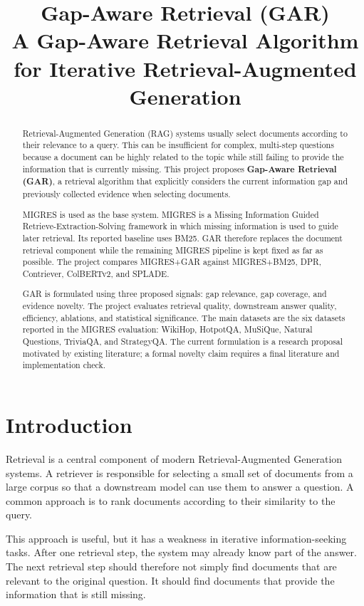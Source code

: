 \documentclass[11pt,a4paper]{article}
\title{\textbf{Gap-Aware Retrieval (GAR)}\\[4pt]\large A Gap-Aware Retrieval Algorithm for Iterative Retrieval-Augmented Generation}
\author{}
\date{}
\begin{document}
\maketitle

\begin{abstract}
Retrieval-Augmented Generation (RAG) systems usually select documents according to their relevance to a query. This can be insufficient for complex, multi-step questions because a document can be highly related to the topic while still failing to provide the information that is currently missing. This project proposes \textbf{Gap-Aware Retrieval (GAR)}, a retrieval algorithm that explicitly considers the current information gap and previously collected evidence when selecting documents.

MIGRES is used as the base system. MIGRES is a Missing Information Guided Retrieve-Extraction-Solving framework in which missing information is used to guide later retrieval. Its reported baseline uses BM25. GAR therefore replaces the document retrieval component while the remaining MIGRES pipeline is kept fixed as far as possible. The project compares MIGRES+GAR against MIGRES+BM25, DPR, Contriever, ColBERTv2, and SPLADE.

GAR is formulated using three proposed signals: gap relevance, gap coverage, and evidence novelty. The project evaluates retrieval quality, downstream answer quality, efficiency, ablations, and statistical significance. The main datasets are the six datasets reported in the MIGRES evaluation: WikiHop, HotpotQA, MuSiQue, Natural Questions, TriviaQA, and StrategyQA. The current formulation is a research proposal motivated by existing literature; a formal novelty claim requires a final literature and implementation check.
\end{abstract}

\section{Introduction}

Retrieval is a central component of modern Retrieval-Augmented Generation systems. A retriever is responsible for selecting a small set of documents from a large corpus so that a downstream model can use them to answer a question. A common approach is to rank documents according to their similarity to the query.

This approach is useful, but it has a weakness in iterative information-seeking tasks. After one retrieval step, the system may already know part of the answer. The next retrieval step should therefore not simply find documents that are relevant to the original question. It should find documents that provide the information that is still missing.
\end{document}

